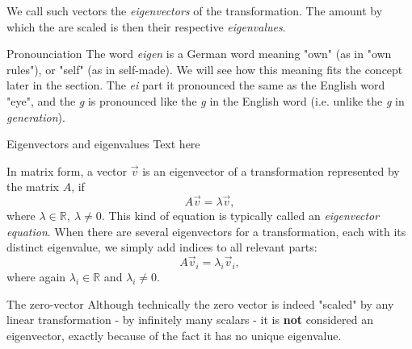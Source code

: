 We call such vectors the \emph{eigenvectors} of the transformation. The amount by which the are scaled is then their respective \emph{eigenvalues}.

\begin{note}{Pronounciation}{}
	The word \textit{eigen} is a German word meaning "own" (as in "own rules"), or "self" (as in self-made). We will see how this meaning fits the concept later in the section. The \textit{ei} part it pronounced the same as the English word "eye", and the \textit{g} is pronounced like the \textit{g} in the English word  (i.e. unlike the \textit{g} in \textit{generation}).
\end{note}

\begin{example}{Eigenvectors and eigenvalues}{}
	Text here
\end{example}

In matrix form, a vector $\vec{v}$ is an eigenvector of a transformation represented by the matrix $A$, if
\begin{equation}
	A\vec{v} = \lambda\vec{v},
	\label{eq:eigenvector_matrix_form}
\end{equation}
where $\lambda\in\mathbb{R},\ \lambda\neq0$. This kind of equation is typically called an \emph{eigenvector equation}. When there are several eigenvectors for a transformation, each with its distinct eigenvalue, we simply add indices to all relevant parts:
\begin{equation}
	A\vec{v}_{i} = \lambda_{i}\vec{v}_{i},
	\label{eq:eigenvector_matrix_form_indeces}
\end{equation}
where again $\lambda_{i}\in\mathbb{R}$ and $\lambda_{i}\neq0$.

\begin{note}{The zero-vector}{}
	Although technically the zero vector is indeed "scaled" by any linear transformation - by infinitely many scalars - it is \textbf{not} considered an eigenvector, exactly because of the fact it has no unique eigenvalue.
\end{note}

